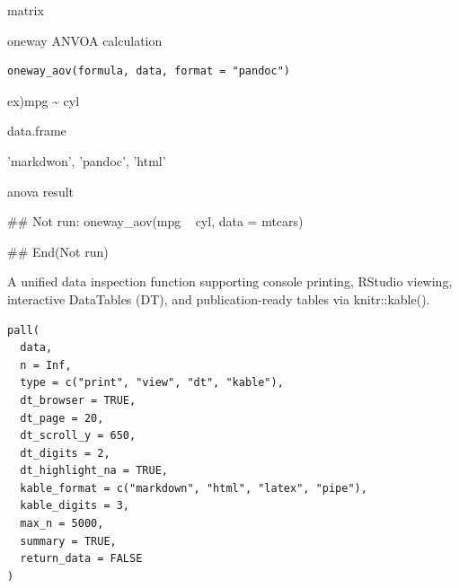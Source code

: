 \documentclass[a4paper]{book}
\begin{document}
%
\begin{Value}
matrix
\end{Value}
%
\begin{Description}
oneway ANVOA calculation
\end{Description}
%
\begin{Usage}
\begin{verbatim}
oneway_aov(formula, data, format = "pandoc")
\end{verbatim}
\end{Usage}
%
\begin{Arguments}
\begin{ldescription}
\item[\code{formula}] ex)mpg \textasciitilde{} cyl

\item[\code{data}] data.frame

\item[\code{format}] 'markdwon', 'pandoc', 'html'
\end{ldescription}
\end{Arguments}
%
\begin{Value}
anova result
\end{Value}
%
\begin{Examples}
\begin{ExampleCode}
## Not run: 
oneway_aov(mpg ~ cyl, data = mtcars)

## End(Not run)

\end{ExampleCode}
\end{Examples}
%
\begin{Description}
A unified data inspection function supporting console printing,
RStudio viewing, interactive DataTables (DT), and publication-ready
tables via knitr::kable().
\end{Description}
%
\begin{Usage}
\begin{verbatim}
pall(
  data,
  n = Inf,
  type = c("print", "view", "dt", "kable"),
  dt_browser = TRUE,
  dt_page = 20,
  dt_scroll_y = 650,
  dt_digits = 2,
  dt_highlight_na = TRUE,
  kable_format = c("markdown", "html", "latex", "pipe"),
  kable_digits = 3,
  max_n = 5000,
  summary = TRUE,
  return_data = FALSE
)
\end{verbatim}
\end{Usage}
%
\end{document}
